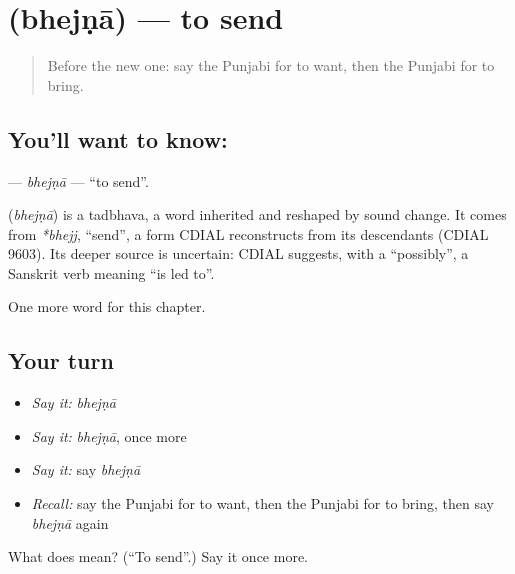 \section[\texorpdfstring{\pa{ਭੇਜਣਾ} (bhejṇā)}{ਭੇਜਣਾ (bhejṇā)}]{ (bhejṇā) — to send}

\label{lesson:PA-C60-bhejna}



\begin{quote}
Before the new one: say the Punjabi for to want, then the Punjabi for to bring.
\end{quote}

\subsection*{You'll want to know: }
\textbf{} — \emph{bhejṇā} — \textquotedblleft{}to send\textquotedblright{}.

\begin{cousinweb}
\textbf{} (\emph{bhejṇā}) is a tadbhava, a word inherited and reshaped by sound change. It comes from \emph{*bhejj}, \textquotedblleft{}send\textquotedblright{}, a form CDIAL reconstructs from its descendants (CDIAL 9603). Its deeper source is uncertain: CDIAL suggests, with a \textquotedblleft{}possibly\textquotedblright{}, a Sanskrit verb meaning \textquotedblleft{}is led to\textquotedblright{}.
\end{cousinweb}

\begin{grammarlens}[title={What you've built}]
One more word for this chapter.
\end{grammarlens}

\subsection*{Your turn}
\begin{itemize}
\raggedright
  \item \emph{Say it:} \emph{bhejṇā}
  \item \emph{Say it:} \emph{bhejṇā}, once more
  \item \emph{Say it:} say \emph{bhejṇā}
  \item \emph{Recall:} say the Punjabi for to want, then the Punjabi for to bring, then say \emph{bhejṇā} again
\end{itemize}

\begin{tcolorbox}[breakable,colback=teal!4,colframe=teal!35!black,title={Before you move on}]
What does  mean? (\textquotedblleft{}To send\textquotedblright{}.) Say it once more.
\end{tcolorbox}
